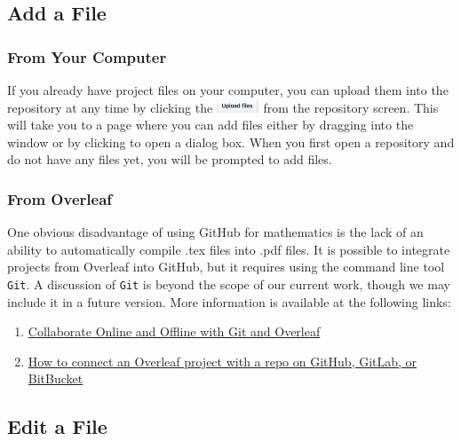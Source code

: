 \documentclass[11pt]{article}
\begin{document}
\subsection{Add a File}\label{ss:add-file}

\subsubsection{From Your Computer} 

If you already have project files on your computer, you can upload them into the repository at any time by clicking the \includegraphics[width=0.5in]{UploadFilesbutton} from the repository screen. This will take you to a page where you can add files either by dragging into the window or by clicking to open a dialog box. When you first open a repository and do not have any files yet, you will be prompted to add files. 

\subsubsection{From Overleaf}

One obvious disadvantage of using GitHub for mathematics is the lack of an ability to automatically compile .tex files into .pdf files. 
It is possible to integrate projects from Overleaf into GitHub, but it requires using the command line tool \texttt{Git}. A discussion of \texttt{Git} is beyond the scope of our current work, though we may include it in a future version. More information is available at the following links: \\

\begin{enumerate}
\item \href{https://www.overleaf.com/blog/195-new-collaborate-online-and-offline-with-overleaf-and-git-beta#.Wx6qPI5r06Y}{Collaborate Online and Offline with Git and Overleaf}
\item \href{https://www.overleaf.com/help/233-how-do-i-connect-an-overleaf-project-with-a-repo-on-github#.Wx6qfY5r06Y}{ How to connect an Overleaf project with a repo on GitHub, GitLab, or BitBucket}
\end{enumerate}

\subsection{Edit a File}\label{ss:edit-file}
\end{document}
